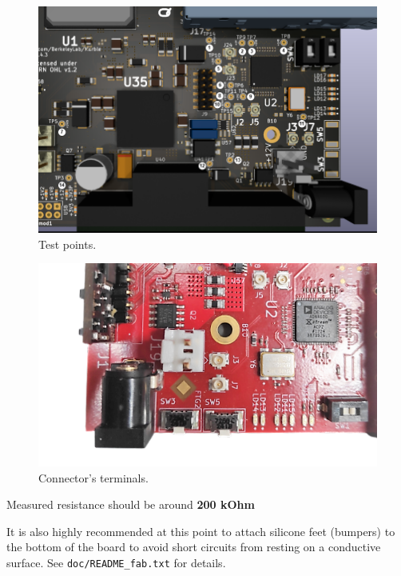 \documentclass[12pt,oneside,a4]{article}
\begin{document}
\begin{figure}[H]
\begin{center}
\includegraphics[width=1\linewidth]{Marble_TP.png}
 \caption{Test points. }\label{tp}
\end{center}
\end{figure}


\begin{figure}[H]
\begin{center}
\includegraphics[width=0.9\linewidth]{J19.png}
 \caption{Connector's terminals. }\label{fig:j19}
\end{center}
\end{figure}
\begin{leftbar}
Measured resistance should be around \textbf{{\color{red}200 kOhm}}
\end{leftbar}

It is also highly recommended at this point to attach silicone feet (bumpers) to the bottom of the board to avoid
short circuits from resting on a conductive surface.  See \texttt{doc/README\_fab.txt} for details.
\end{document}
